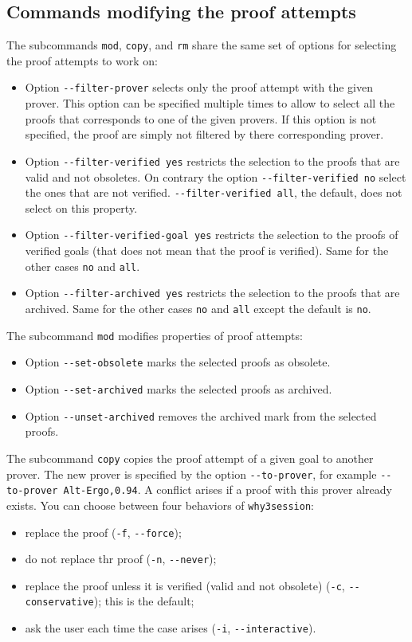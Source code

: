 \subsection{Commands modifying the proof attempts}

The subcommands \texttt{mod}, \texttt{copy}, and \texttt{rm} share the
same set of options for selecting the proof attempts to work on:
\begin{itemize}
\item Option \verb|--filter-prover| selects only the proof attempt with
  the given prover. This option can be specified multiple times to
  allow to select all the proofs that corresponds to one of the given
  provers. If this option is not specified, the proof are simply not
  filtered by there corresponding prover.
\item Option \verb|--filter-verified yes| restricts the selection to
  the proofs that are valid and not obsoletes. On contrary the option
  \verb|--filter-verified no| select the ones that are not verified.
  \verb|--filter-verified all|, the default, does not select on this property.
\item Option \verb|--filter-verified-goal yes| restricts the selection
  to the proofs of verified goals (that does not mean that the proof is
  verified). Same for the other cases \verb|no| and \verb|all|.
\item Option \verb|--filter-archived yes| restricts the selection
  to the proofs that are archived. Same for the other cases \verb|no|
  and \verb|all| except the default is \verb|no|.
\end{itemize}

\noindent
The subcommand \texttt{mod} modifies properties of proof
attempts:
\begin{itemize}
\item Option \verb|--set-obsolete| marks the selected proofs as
  obsolete.
\item Option \verb|--set-archived| marks the selected proofs as archived.
\item Option \verb|--unset-archived| removes the archived mark from the selected proofs.
\end{itemize}

The subcommand \texttt{copy} copies the proof attempt of a given goal to another
prover. The new prover is specified by the option
\verb|--to-prover|, for example \texttt{-{}-to-prover Alt-Ergo,0.94}.
A conflict arises if a proof with this prover already exists.
You can choose between four behaviors of \texttt{why3session}:
\begin{itemize}
\item replace the proof (\verb|-f|, \verb|--force|);
\item do not replace thr proof (\verb|-n|, \verb|--never|);
\item replace the proof unless it is verified (valid and not
  obsolete) (\verb|-c|, \verb|--conservative|); this is the default;
\item ask the user each time the case arises (\verb|-i|, \verb|--interactive|).
\end{itemize}


